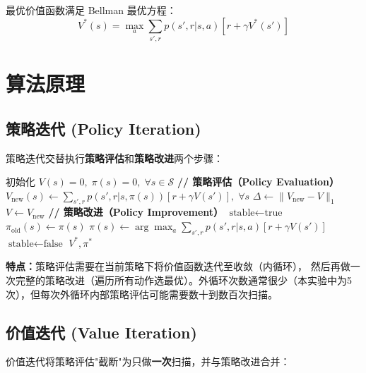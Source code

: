 \documentclass[12pt,a4paper]{ctexart}
\begin{document}
最优价值函数满足 Bellman 最优方程：
\begin{equation}
V^{*}(s) = \max_{a} \sum_{s',r} p(s',r|s,a) \left[ r + \gamma V^{*}(s') \right]
\end{equation}

\section{算法原理}

\subsection{策略迭代 (Policy Iteration)}

策略迭代交替执行\textbf{策略评估}和\textbf{策略改进}两个步骤：

\begin{algorithm}[H]
\caption{策略迭代算法}
\begin{algorithmic}[1]
\STATE 初始化 $V(s) = 0, \; \pi(s) = 0, \; \forall s \in \mathcal{S}$
\REPEAT
  \STATE \textbf{// 策略评估（Policy Evaluation）}
  \REPEAT
    \STATE $V_{\text{new}}(s) \leftarrow \sum_{s',r} p(s',r|s,\pi(s))[r + \gamma V(s')], \; \forall s$
    \STATE $\Delta \leftarrow \|V_{\text{new}} - V\|_1$
    \STATE $V \leftarrow V_{\text{new}}$
  \UNTIL{$\Delta < \delta$}
  \STATE \textbf{// 策略改进（Policy Improvement）}
  \STATE $\text{stable} \leftarrow \text{true}$
    \STATE $\pi_{\text{old}}(s) \leftarrow \pi(s)$
    \STATE $\pi(s) \leftarrow \arg\max_a \sum_{s',r} p(s',r|s,a)[r + \gamma V(s')]$
      \STATE $\text{stable} \leftarrow \text{false}$
    \ENDIF
  \ENDFOR
{}
\RETURN $V^*, \pi^*$
\end{algorithmic}
\end{algorithm}

\textbf{特点：}策略评估需要在当前策略下将价值函数迭代至收敛（内循环），
然后再做一次完整的策略改进（遍历所有动作选最优）。外循环次数通常很少（本实验中为5次），但每次外循环内部策略评估可能需要数十到数百次扫描。

\subsection{价值迭代 (Value Iteration)}

价值迭代将策略评估"截断"为只做\textbf{一次}扫描，并与策略改进合并：
\end{document}
